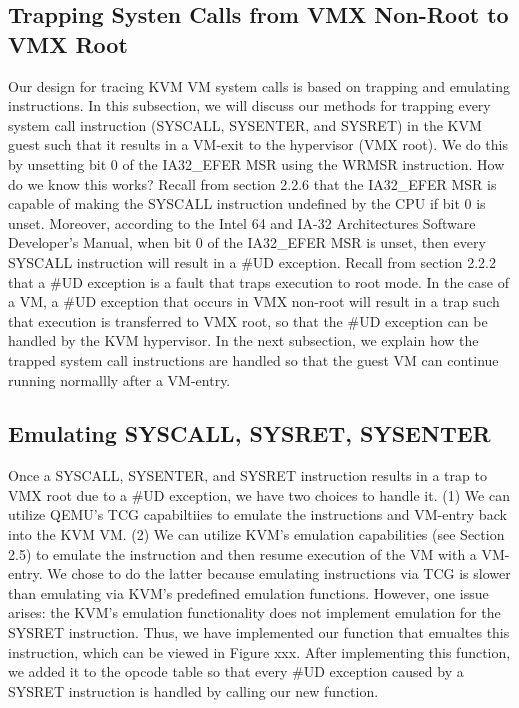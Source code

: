 \documentclass{report}
\begin{document}
\begin{spacing}{1.5}
\subsection{Trapping Systen Calls from VMX Non-Root to VMX Root}
{\large
Our design for tracing KVM VM system calls is based on trapping and emulating instructions. In this subsection, we will discuss our methods for trapping every system call instruction (SYSCALL, SYSENTER, and SYSRET) in the KVM guest such that it results in a VM-exit to the hypervisor (VMX root). We do this by unsetting bit 0 of the IA32\_EFER MSR using the WRMSR instruction. How do we know this works? Recall from section 2.2.6 that the IA32\_EFER MSR is capable of making the SYSCALL instruction undefined by the CPU if bit 0 is unset. Moreover, according to the Intel 64 and IA-32 Architectures Software Developer’s Manual, when bit 0 of the IA32\_EFER MSR is unset, then every SYSCALL instruction will result in a \#UD exception. Recall from section 2.2.2 that a \#UD exception is a fault that traps execution to root mode. In the case of a VM, a \#UD exception that occurs in VMX non-root will result in a trap such that execution is transferred to VMX root, so that the \#UD exception can be handled by the KVM hypervisor. In the next subsection, we explain how the trapped system call instructions are handled so that the guest VM can continue running normallly after a VM-entry.
\newline
}


\subsection{Emulating SYSCALL, SYSRET, SYSENTER}

{\large
Once a SYSCALL, SYSENTER, and SYSRET instruction results in a trap to VMX root due to a \#UD exception, we have two choices to handle it. (1) We can utilize QEMU's TCG capabiltiies to emulate the instructions and VM-entry back into the KVM VM. (2) We can utilize KVM's emulation capabilities (see Section 2.5) to emulate the instruction and then resume execution of the VM with a VM-entry. We chose to do the latter because emulating instructions via TCG is slower than emulating via KVM's predefined emulation functions. However, one issue arises: the KVM's emulation functionality does not implement emulation for the SYSRET instruction. Thus, we have implemented our function that emualtes this instruction, which can be viewed in Figure xxx. After implementing this function, we added it to the opcode table so that every \#UD exception caused by a SYSRET instruction is handled by calling our new function.
\newline
}



\end{spacing}
\end{document}
